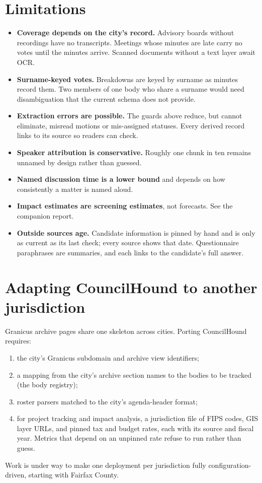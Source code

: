 \documentclass[11pt]{article}
\begin{document}
\section{Limitations}

\begin{itemize}
  \item \textbf{Coverage depends on the city's record.} Advisory boards without
        recordings have no transcripts. Meetings whose minutes are late carry no votes
        until the minutes arrive. Scanned documents without a text layer await OCR.
  \item \textbf{Surname-keyed votes.} Breakdowns are keyed by surname as minutes record
        them. Two members of one body who share a surname would need disambiguation that
        the current schema does not provide.
  \item \textbf{Extraction errors are possible.} The guards above reduce, but cannot
        eliminate, misread motions or mis-assigned statuses. Every derived record links to
        its source so readers can check.
  \item \textbf{Speaker attribution is conservative.} Roughly one chunk in ten remains
        unnamed by design rather than guessed.
  \item \textbf{Named discussion time is a lower bound} and depends on how consistently
        a matter is named aloud.
  \item \textbf{Impact estimates are screening estimates}, not forecasts. See the
        companion report.
  \item \textbf{Outside sources age.} Candidate information is pinned by hand and is only
        as current as its last check; every source shows that date. Questionnaire
        paraphrases are summaries, and each links to the candidate's full answer.
\end{itemize}

\section{Adapting CouncilHound to another jurisdiction}
\label{sec:portability}

Granicus archive pages share one skeleton across cities. Porting CouncilHound requires:
\begin{enumerate}
  \item the city's Granicus subdomain and archive view identifiers;
  \item a mapping from the city's archive section names to the bodies to be tracked
        (the body registry);
  \item roster parsers matched to the city's agenda-header format;
  \item for project tracking and impact analysis, a jurisdiction file of FIPS codes,
        GIS layer URLs, and pinned tax and budget rates, each with its source and fiscal
        year. Metrics that depend on an unpinned rate refuse to run rather than guess.
\end{enumerate}
Work is under way to make one deployment per jurisdiction fully configuration-driven,
starting with Fairfax County.
\end{document}
